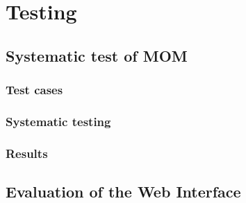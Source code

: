 \chapter{Testing}

\section{Systematic test of MOM}
\subsection{Test cases} %
\subsection{Systematic testing}
\subsection{Results}

\section{Evaluation of the Web Interface}%